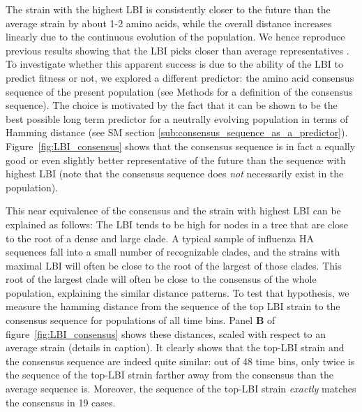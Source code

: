 \documentclass[reprint,amsmath,amssymb,superscriptaddress,showpacs,rmp]{revtex4-1}
\begin{document}
The strain with the highest LBI is consistently closer to the future than the average strain by about 1-2 amino acids, while the overall distance increases linearly due to the continuous evolution of the population.
We hence reproduce previous results showing that the LBI picks closer than average representatives \citep{neher_predicting_2014}.
To investigate whether this apparent success is due to the ability of the LBI to predict fitness or not, we explored a different predictor: the amino acid consensus sequence of the present population (see Methods for a definition of the consensus sequence).
The choice is motivated by the fact that it can be shown to be the best possible long term predictor for a neutrally evolving population in terms of Hamming distance (see SM section \ref{sub:consensus_sequence_as_a_predictor}).
Figure~\ref{fig:LBI_consensus} shows that the consensus sequence is in fact a equally good or even slightly better representative of the future than the sequence with highest LBI
(note that the consensus sequence does \emph{not} necessarily exist in the population).

This near equivalence of the consensus and the strain with highest LBI can be explained as follows:
The LBI tends to be high for nodes in a tree that are close to the root of a dense and large clade.
A typical sample of influenza HA sequences fall into a small number of recognizable clades, and the strains with maximal LBI will often be close to the root of the largest of those clades.
This root of the largest clade will often be close to the consensus of the whole population, explaining the similar distance patterns.
To test that hypothesis, we measure the hamming distance from the sequence of the top LBI strain to the consensus sequence for populations of all time bins.
Panel \textbf{B} of figure~\ref{fig:LBI_consensus} shows these distances, scaled with respect to an average strain (details in caption). It clearly shows that the top-LBI strain and the consensus sequence are indeed quite similar: out of 48 time bins, only twice is the sequence of the top-LBI strain farther away from the consensus than the average sequence is. Moreover, the sequence of the top-LBI strain \emph{exactly} matches the consensus in 19 cases.
\end{document}
